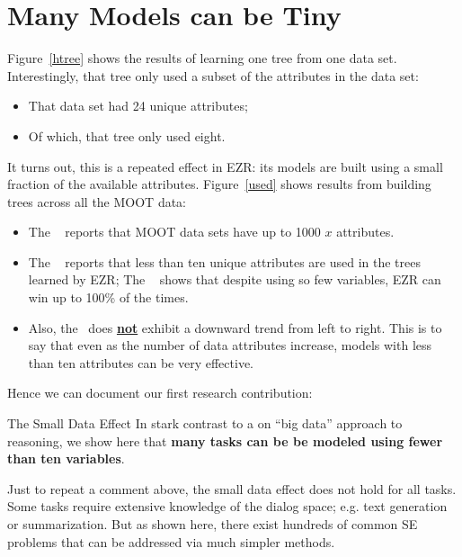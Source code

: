 \documentclass[AMA,STIX2COL]{WileyNJDv5}
\begin{document}
\section{ Many Models can be Tiny}
Figure~\ref{htree} shows the results of learning one tree from one data set.
Interestingly, that tree only used a subset of the attributes in the data set: 
\begin{itemize}
\item That data set had 24 unique attributes;
\item Of which, that tree only used eight.
\end{itemize}
It turns out, this is a repeated effect in EZR: its models are built using a small fraction
of the available attributes.
Figure~\ref{used} shows results from building trees across all the MOOT data:
\begin{itemize}
\item
 The \color{darkyellow}{\bf yellow line}\color{black}~ reports
 that MOOT data sets have up to 1000 $x$ attributes.
 \item
 The \color{red}{\bf red line}\color{black}~
 reports that less than ten unique attributes are used in the
 trees learned by EZR;
 The \color{blue}{\bf blue line}\color{black}~ shows that despite
 using so few variables, EZR  can win up to 100\% of the times.
 \item Also, the \color{blue}{\bf blue line}\color{black}~does
 \underline{\bf not} exhibit a downward trend from left to right. This is to
 say that even as the number of data attributes increase, models with less than ten attributes can be very effective.
 \end{itemize}
 Hence we can document our first research contribution:

 \begin{hence}{The Small Data Effect}
In stark contrast to a on ``big data'' approach to reasoning, we show here that {\bf  
many tasks can be be modeled using   fewer than ten  variables}.
\end{hence}
 Just to repeat a comment above,  the small data effect does not hold for all tasks.
 Some tasks require extensive knowledge of the dialog space; e.g. text generation or summarization. But as shown here, there exist
hundreds of common SE problems that can be addressed via much simpler methods.
\end{document}
